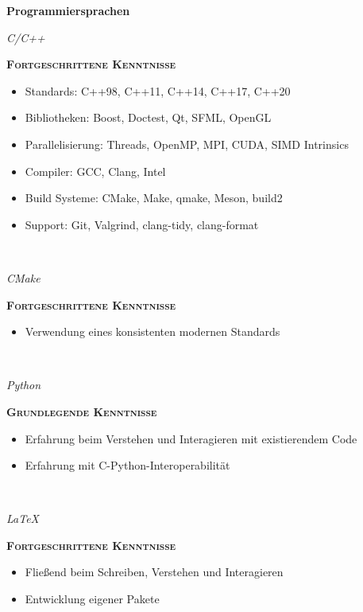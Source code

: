 \documentclass[8pt]{article}
\newcommand{\cvEducationHeading}[2]{%
  {\centering\colorbox{cvBackgroundColor}{\parbox{0.98\linewidth}{\textbf{#1} \hfill \textit{\footnotesize #2}}}} \par
}
\newenvironment{cvEducationItem}[2]{
  \medskip
  \par
  \begin{minipage}[c]{0.15\linewidth}
    \raggedleft
    \footnotesize
    \textit{#1}
  \end{minipage}
  \quad
  \vrule
  \quad
  \begin{minipage}[t]{0.7\linewidth}
    \textsc{\color{cvColor} \textbf{#2}}
    \footnotesize
    \begin{itemize}[itemsep=-1mm, leftmargin=3mm]
}{
    \end{itemize}
  \end{minipage}
  \\[0.5em]
}
\begin{document}
  \cvEducationHeading{Programmiersprachen}{}
  \begin{multicols}{2}
  \begin{cvEducationItem}{C/C++}{Fortgeschrittene Kenntnisse}
    \item Standards: C++98, C++11, C++14, C++17, C++20
    \item Bibliotheken: Boost, Doctest, Qt, SFML, OpenGL
    \item Parallelisierung: Threads, OpenMP, MPI, CUDA, SIMD Intrinsics
    \item Compiler: GCC, Clang, Intel
    \item Build Systeme: CMake, Make, qmake, Meson, build2
    \item Support: Git, Valgrind, clang-tidy, clang-format
  \end{cvEducationItem}
  \begin{cvEducationItem}{CMake}{Fortgeschrittene Kenntnisse}
    \item Verwendung eines konsistenten modernen Standards
  \end{cvEducationItem}
  \begin{cvEducationItem}{Python}{Grundlegende Kenntnisse}
    \item Erfahrung beim Verstehen und Interagieren mit existierendem Code
    \item Erfahrung mit C-Python-Interoperabilität
  \end{cvEducationItem}
  \begin{cvEducationItem}{LaTeX}{Fortgeschrittene Kenntnisse}
    \item Fließend beim Schreiben, Verstehen und Interagieren
    \item Entwicklung eigener Pakete
  \end{cvEducationItem}
  \end{multicols}

\end{document}
